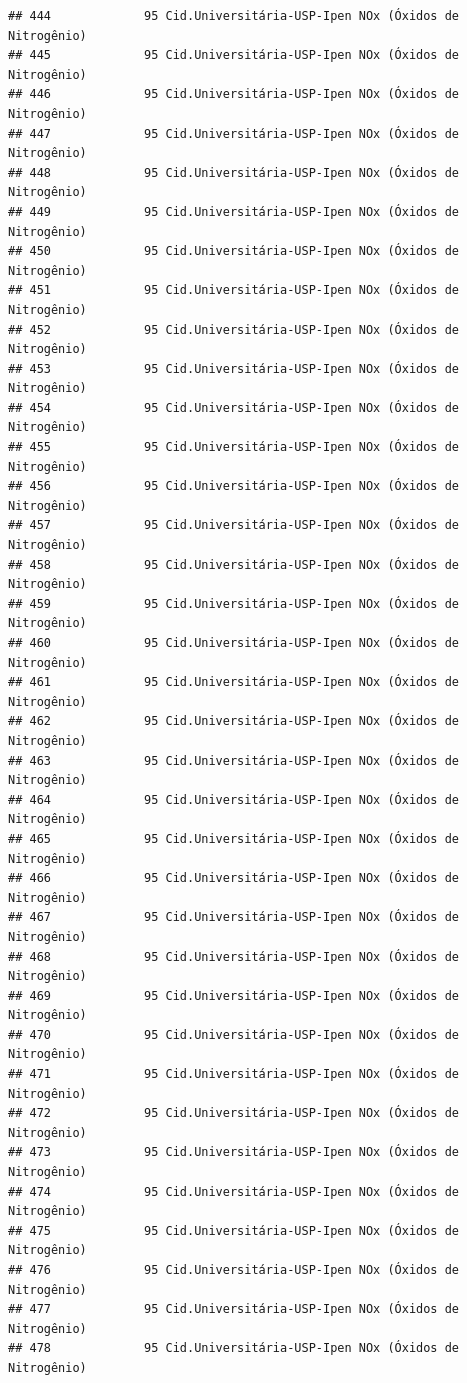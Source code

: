 \documentclass[]{book}
\begin{document}
\begin{verbatim}
## 444             95 Cid.Universitária-USP-Ipen NOx (Óxidos de Nitrogênio)
## 445             95 Cid.Universitária-USP-Ipen NOx (Óxidos de Nitrogênio)
## 446             95 Cid.Universitária-USP-Ipen NOx (Óxidos de Nitrogênio)
## 447             95 Cid.Universitária-USP-Ipen NOx (Óxidos de Nitrogênio)
## 448             95 Cid.Universitária-USP-Ipen NOx (Óxidos de Nitrogênio)
## 449             95 Cid.Universitária-USP-Ipen NOx (Óxidos de Nitrogênio)
## 450             95 Cid.Universitária-USP-Ipen NOx (Óxidos de Nitrogênio)
## 451             95 Cid.Universitária-USP-Ipen NOx (Óxidos de Nitrogênio)
## 452             95 Cid.Universitária-USP-Ipen NOx (Óxidos de Nitrogênio)
## 453             95 Cid.Universitária-USP-Ipen NOx (Óxidos de Nitrogênio)
## 454             95 Cid.Universitária-USP-Ipen NOx (Óxidos de Nitrogênio)
## 455             95 Cid.Universitária-USP-Ipen NOx (Óxidos de Nitrogênio)
## 456             95 Cid.Universitária-USP-Ipen NOx (Óxidos de Nitrogênio)
## 457             95 Cid.Universitária-USP-Ipen NOx (Óxidos de Nitrogênio)
## 458             95 Cid.Universitária-USP-Ipen NOx (Óxidos de Nitrogênio)
## 459             95 Cid.Universitária-USP-Ipen NOx (Óxidos de Nitrogênio)
## 460             95 Cid.Universitária-USP-Ipen NOx (Óxidos de Nitrogênio)
## 461             95 Cid.Universitária-USP-Ipen NOx (Óxidos de Nitrogênio)
## 462             95 Cid.Universitária-USP-Ipen NOx (Óxidos de Nitrogênio)
## 463             95 Cid.Universitária-USP-Ipen NOx (Óxidos de Nitrogênio)
## 464             95 Cid.Universitária-USP-Ipen NOx (Óxidos de Nitrogênio)
## 465             95 Cid.Universitária-USP-Ipen NOx (Óxidos de Nitrogênio)
## 466             95 Cid.Universitária-USP-Ipen NOx (Óxidos de Nitrogênio)
## 467             95 Cid.Universitária-USP-Ipen NOx (Óxidos de Nitrogênio)
## 468             95 Cid.Universitária-USP-Ipen NOx (Óxidos de Nitrogênio)
## 469             95 Cid.Universitária-USP-Ipen NOx (Óxidos de Nitrogênio)
## 470             95 Cid.Universitária-USP-Ipen NOx (Óxidos de Nitrogênio)
## 471             95 Cid.Universitária-USP-Ipen NOx (Óxidos de Nitrogênio)
## 472             95 Cid.Universitária-USP-Ipen NOx (Óxidos de Nitrogênio)
## 473             95 Cid.Universitária-USP-Ipen NOx (Óxidos de Nitrogênio)
## 474             95 Cid.Universitária-USP-Ipen NOx (Óxidos de Nitrogênio)
## 475             95 Cid.Universitária-USP-Ipen NOx (Óxidos de Nitrogênio)
## 476             95 Cid.Universitária-USP-Ipen NOx (Óxidos de Nitrogênio)
## 477             95 Cid.Universitária-USP-Ipen NOx (Óxidos de Nitrogênio)
## 478             95 Cid.Universitária-USP-Ipen NOx (Óxidos de Nitrogênio)

\end{verbatim}
\end{document}
